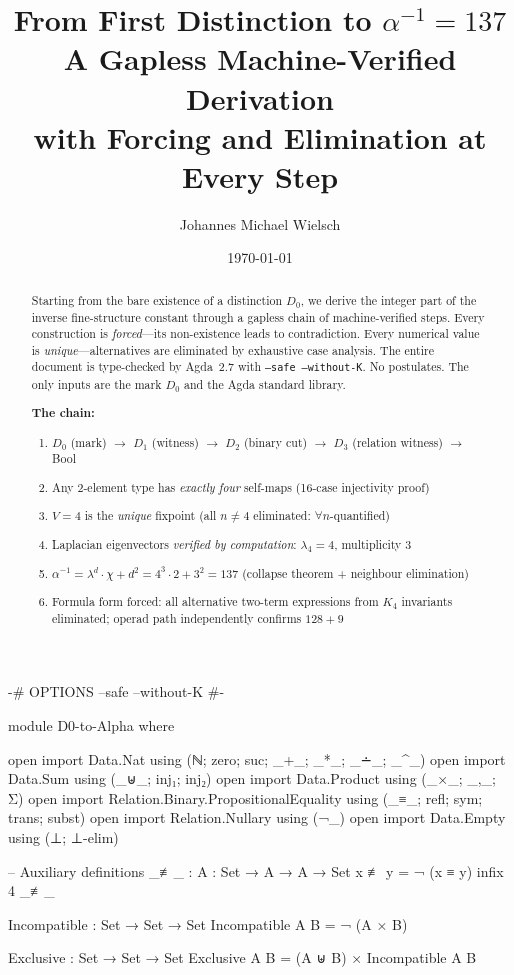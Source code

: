 \documentclass[11pt,a4paper]{article}
\title{From First Distinction to $\alpha^{-1} = 137$\\[0.3em]
{\large A Gapless Machine-Verified Derivation\\with Forcing and Elimination at Every Step}}
\author{Johannes Michael Wielsch}
\date{\today}
\begin{document}
\maketitle

\begin{abstract}
Starting from the bare existence of a distinction $D_0$, we derive the integer
part of the inverse fine-structure constant through a gapless chain of
machine-verified steps. Every construction is \emph{forced}---its
non-existence leads to contradiction. Every numerical value is
\emph{unique}---alternatives are eliminated by exhaustive case analysis.
The entire document is type-checked by Agda~2.7 with
\texttt{--safe --without-K}. No postulates. The only inputs are
the mark $D_0$ and the Agda standard library.

\medskip
\noindent\textbf{The chain:}
\begin{enumerate}
\item $D_0$ (mark) $\to$ $D_1$ (witness) $\to$ $D_2$ (binary cut) $\to$ $D_3$ (relation witness) $\to$ Bool
\item Any 2-element type has \emph{exactly four} self-maps (16-case injectivity proof)
\item $V = 4$ is the \emph{unique} fixpoint (all $n \neq 4$ eliminated: $\forall n$-quantified)
\item Laplacian eigenvectors \emph{verified by computation}: $\lambda_4 = 4$, multiplicity 3
\item $\alpha^{-1} = \lambda^d \cdot \chi + d^2 = 4^3 \cdot 2 + 3^2 = 137$
      (collapse theorem + neighbour elimination)
\item Formula form forced: all alternative two-term expressions from $K_4$
      invariants eliminated; operad path independently confirms $128 + 9$
\end{enumerate}
\end{abstract}

\begin{code}
{-# OPTIONS --safe --without-K #-}

module D0-to-Alpha where

open import Data.Nat using (ℕ; zero; suc; _+_; _*_; _∸_; _^_)
open import Data.Sum using (_⊎_; inj₁; inj₂)
open import Data.Product using (_×_; _,_; Σ)
open import Relation.Binary.PropositionalEquality using (_≡_; refl; sym; trans; subst)
open import Relation.Nullary using (¬_)
open import Data.Empty using (⊥; ⊥-elim)
\end{code}

\begin{code}
-- Auxiliary definitions
_≢_ : {A : Set} → A → A → Set
x ≢ y = ¬ (x ≡ y)
infix 4 _≢_

Incompatible : Set → Set → Set
Incompatible A B = ¬ (A × B)

Exclusive : Set → Set → Set
Exclusive A B = (A ⊎ B) × Incompatible A B
\end{code}
\end{document}
